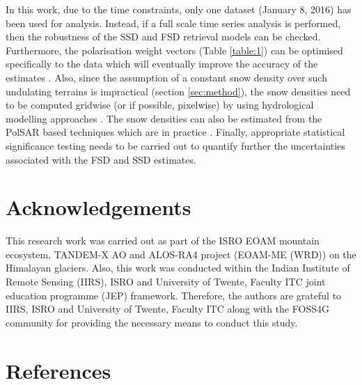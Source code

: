 \documentclass[review]{elsarticle}
\numberwithin{equation}{section}
\numberwithin{figure}{section}
\numberwithin{table}{section}
\begin{document}
In this work, due to the time constraints, only one dataset (January 8, 2016) has been used for analysis. Instead, if a full scale time series analysis is performed, then the robustness of the SSD and FSD retrieval models can be checked. Furthermore, the polarisation weight vectors (Table \ref{table:1}) can be optimised specifically to the data which will eventually improve the accuracy of the estimates \citep{Cloude2005, Cloude2010}. Also, since the assumption of a constant snow density over such undulating terrains is impractical (section \ref{sec:method}), the snow densities need to be computed gridwise (or if possible, pixelwise) by using hydrological modelling approaches \citep{Bartelt2002, Liang1994}. The snow densities can also be estimated from the PolSAR based techniques which are in practice \citep{Singh2017, Thakur2012}. Finally, appropriate statistical significance testing needs to be carried out to quantify further the uncertainties associated with the FSD and SSD estimates.

\section*{Acknowledgements}
This research work was carried out as part of the ISRO EOAM mountain ecosystem, TANDEM-X AO and ALOS-RA4 project (EOAM-ME (WRD)) on the Himalayan glaciers. Also, this work was conducted within the Indian Institute of Remote Sensing (IIRS), ISRO and University of Twente, Faculty ITC joint education programme (JEP) framework. Therefore, the authors are grateful to IIRS, ISRO and University of Twente, Faculty ITC along with the FOSS4G community for providing the necessary means to conduct this study.  
\section*{References}


\end{document}

